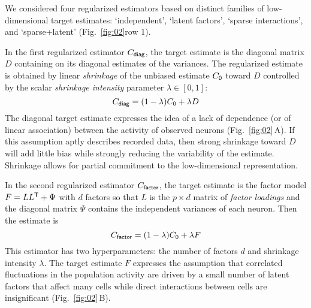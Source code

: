\documentclass[10pt]{article}
\newcommand{\T}{{\sf T}}
\begin{document}
We considered four regularized estimators based on distinct families of low-dimensional target estimates: `independent', `latent factors', `sparse interactions', and `sparse+latent' (Fig.~\ref{fig:02}\;row 1).  

In the first regularized estimator $C_{\sf diag}$, the target estimate is the diagonal matrix $D$ containing on its diagonal estimates of the variances.
The regularized estimate is obtained by linear \emph{shrinkage} of the unbiased estimate $C_{\sf 0}$ toward $D$ controlled by the scalar \emph{shrinkage intensity} parameter $\lambda \in [0, 1]$:
\begin{equation}
C_{\sf diag} = (1-\lambda) C_{\sf 0} + \lambda D
\end{equation}
The diagonal target estimate expresses the idea of a lack of dependence (or of linear association) between the activity of observed neurons (Fig.~\ref{fig:02}\,A).  
If this assumption aptly describes recorded data, then strong shrinkage toward $D$ will add little bias while strongly reducing the variability of the estimate. Shrinkage allows for partial commitment to the low-dimensional representation.  

In the second regularized estimator $C_{\sf factor}$, the target estimate is the factor model $F =  L L^\T + \Psi$ with $d$ factors so that $L$ is the $p\times d$ matrix of \emph{factor loadings} and the diagonal matrix $\Psi$ contains the independent variances of each neuron.
Then the estimate is 
\begin{equation}
C_{\sf factor} = (1-\lambda) C_{\sf 0} + \lambda F
\end{equation}
This estimator has two hyperparameters: the number of factors $d$ and shrinkage intensity $\lambda$. The target estimate $F$ expresses the assumption that correlated fluctuations in the population activity are driven by a small number of latent factors that affect many cells while direct interactions between cells are insignificant (Fig.~\ref{fig:02}\,B).   
\end{document}

